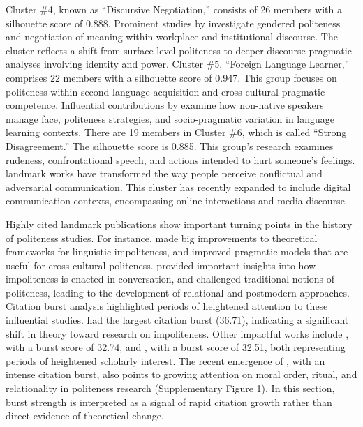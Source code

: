 \documentclass[english]{textolivre}
\begin{document}
Cluster \#4, known as ``Discursive Negotiation,'' consists of 26 members with a silhouette score of 0.888. Prominent studies by \textcite{haugh2007, holmes2005} investigate gendered politeness and negotiation of meaning within workplace and institutional discourse. The cluster reflects a shift from surface-level politeness to deeper discourse-pragmatic analyses involving identity and power. Cluster \#5, ``Foreign Language Learner,'' comprises 22 members with a silhouette score of 0.947. This group focuses on politeness within second language acquisition and cross-cultural pragmatic competence. Influential contributions by \textcite{felixbrasdefer2006, felixbrasdefer2008, haugh2004} examine how non-native speakers manage face, politeness strategies, and socio-pragmatic variation in language learning contexts. There are 19 members in Cluster \#6, which is called ``Strong Disagreement.'' The silhouette score is 0.885. This group’s research examines rudeness, confrontational speech, and actions intended to hurt someone’s feelings. \textcite{culpeper2011b, haugh2010} landmark works have transformed the way people perceive conflictual and adversarial communication. This cluster has recently expanded to include digital communication contexts, encompassing online interactions and media discourse.

Highly cited landmark publications show important turning points in the history of politeness studies. For instance, \textcite{culpeper2011b} made big improvements to theoretical frameworks for linguistic impoliteness, and \textcite{leech2014} improved pragmatic models that are useful for cross-cultural politeness. \textcite{bousfield2008a} provided important insights into how impoliteness is enacted in conversation, and \textcite{watts2003} challenged traditional notions of politeness, leading to the development of relational and postmodern approaches. Citation burst analysis highlighted periods of heightened attention to these influential studies. \textcite{culpeper2011b} had the largest citation burst (36.71), indicating a significant shift in theory toward research on impoliteness. Other impactful works include \textcite{bousfield2008a}, with a burst score of 32.74, and \textcite{leech2014}, with a burst score of 32.51, both representing periods of heightened scholarly interest. The recent emergence of \textcite{kadar2017b}, with an intense citation burst, also points to growing attention on moral order, ritual, and relationality in politeness research (Supplementary Figure 1). In this section, burst strength is interpreted as a signal of rapid citation growth rather than direct evidence of theoretical change.
\end{document}
